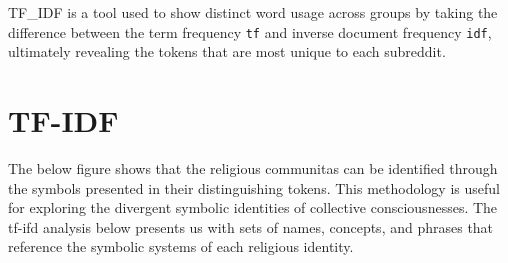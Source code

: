 \documentclass[
]{book}
\newenvironment{Shaded}{\begin{snugshade}}{\end{snugshade}}
\newcommand{\CommentTok}[1]{\textcolor[rgb]{0.56,0.35,0.01}{\textit{#1}}}
\newcommand{\DataTypeTok}[1]{\textcolor[rgb]{0.13,0.29,0.53}{#1}}
\newcommand{\DecValTok}[1]{\textcolor[rgb]{0.00,0.00,0.81}{#1}}
\newcommand{\KeywordTok}[1]{\textcolor[rgb]{0.13,0.29,0.53}{\textbf{#1}}}
\newcommand{\NormalTok}[1]{#1}
\newcommand{\OperatorTok}[1]{\textcolor[rgb]{0.81,0.36,0.00}{\textbf{#1}}}
\newcommand{\OtherTok}[1]{\textcolor[rgb]{0.56,0.35,0.01}{#1}}
\newcommand{\StringTok}[1]{\textcolor[rgb]{0.31,0.60,0.02}{#1}}
\begin{document}
TF\_IDF is a tool used to show distinct word usage across groups by taking the difference between the term frequency \texttt{tf} and inverse document frequency \texttt{idf}, ultimately revealing the tokens that are most unique to each subreddit.

\begin{Shaded}
\end{Shaded}

\hypertarget{tf-idf}{%
\section{TF-IDF}\label{tf-idf}}

The below figure shows that the religious communitas can be identified through the symbols presented in their distinguishing tokens. This methodology is useful for exploring the divergent symbolic identities of collective consciousnesses. The tf-ifd analysis below presents us with sets of names, concepts, and phrases that reference the symbolic systems of each religious identity.

\begin{Shaded}
\end{Shaded}
\end{document}
